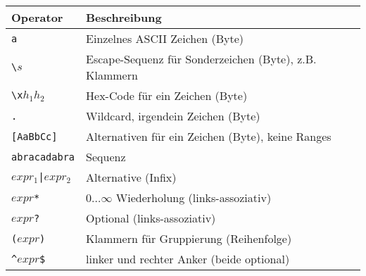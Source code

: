 \documentclass[a4paper, 12pt]{article}
\theoremstyle{mystyle}
\begin{document}

\begin{tabular}{l|l}
Operator                                                              & Beschreibung                            \\ \hline
\color{red}\texttt{a} & Einzelnes ASCII Zeichen (Byte) \\
\color{red}\texttt{\textbackslash}\color{black}$s$ & Escape-Sequenz für Sonderzeichen (Byte), z.B. Klammern   \\
\color{red}\texttt{\textbackslash x}\color{black}$h_1h_2$ & Hex-Code für ein Zeichen (Byte)   \\
\color{red}\texttt{.}                                             & Wildcard, irgendein Zeichen (Byte) \\
\color{red}\texttt{[AaBbCc]}                                     & Alternativen für ein Zeichen (Byte), keine Ranges \\
\color{red}\texttt{abracadabra} & Sequenz \\
$expr_1$\color{red}\texttt{|}\color{black}$expr_2$                                             & Alternative (Infix) \\
$expr$\color{red}\texttt{*}                   & $0\dots\infty$ Wiederholung (links-assoziativ)            \\
$expr$\color{red}\texttt{?}                                             & Optional (links-assoziativ)             \\
{\color{red}\texttt{(}}$expr${\color{red}\texttt{)}}                                           &   Klammern für Gruppierung (Reihenfolge)   \\
{\color{red}\texttt{\^}}$expr${\color{red}\texttt{\$}} & linker und rechter Anker (beide optional) \\
\end{tabular}
\end{document}
